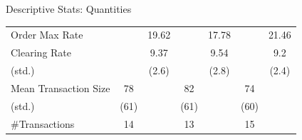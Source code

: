 \documentclass[10pt]{beamer}
\begin{document}
\begin{frame}{Descriptive Stats: Quantities}
\begin{table}[!htbp]
{\begin{threeparttable}
\begin{tabular}{lcccccc}
     Order Max Rate                 &           & 19.62         &           & 17.78         &           & 21.46         \\
      Clearing Rate                  &           & 9.37      &           & 9.54      &           & 9.2       \\
     \hspace{3mm}(std.)             &           & (2.6)     &           & (2.8)     &           & (2.4)     \\
     Mean Transaction Size          & 78        &           & 82        &           & 74        &           \\
     \hspace{3mm}(std.)             & (61)      &           & (61)      &           & (60)      &           \\
     \#Transactions                 & 14        &           & 13        &           & 15        &           \\
    \end{tabular}
    \end{threeparttable}
   }
    \label{tab:summary_stat}
\end{table}
\end{frame}
\end{document}
